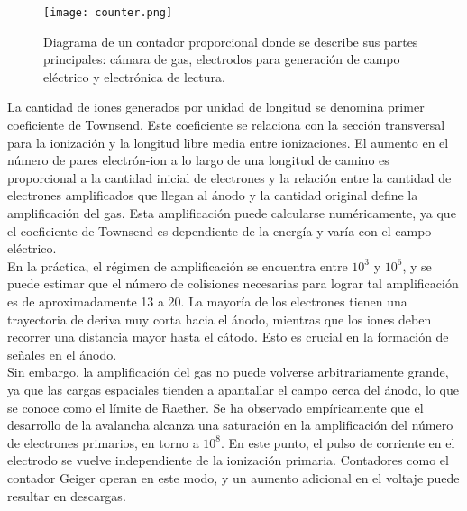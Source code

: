 \documentclass{article}
\begin{document}
\begin{figure}[H]
    \centering
    \texttt{[image: counter.png]}
    \caption{Diagrama de un contador proporcional donde se describe sus partes principales: cámara de gas, electrodos para generación de campo eléctrico y electrónica de lectura.}
    \label{fig:counter}
\end{figure}

\noindent La cantidad de iones generados por unidad de longitud se denomina primer coeficiente de Townsend. Este coeficiente se relaciona con la sección transversal para la ionización y la longitud libre media entre ionizaciones. El aumento en el número de pares electrón-ion a lo largo de una longitud de camino es proporcional a la cantidad inicial de electrones y la relación entre la cantidad de electrones amplificados que llegan al ánodo y la cantidad original define la amplificación del gas. Esta amplificación puede calcularse numéricamente, ya que el coeficiente de Townsend es dependiente de la energía y varía con el campo eléctrico.\\

\noindent En la práctica, el régimen de amplificación se encuentra entre \(10^3\) y \(10^6\), y se puede estimar que el número de colisiones necesarias para lograr tal amplificación es de aproximadamente 13 a 20. La mayoría de los electrones tienen una trayectoria de deriva muy corta hacia el ánodo, mientras que los iones deben recorrer una distancia mayor hasta el cátodo. Esto es crucial en la formación de señales en el ánodo.\\

\noindent Sin embargo, la amplificación del gas no puede volverse arbitrariamente grande, ya que las cargas espaciales tienden a apantallar el campo cerca del ánodo, lo que se conoce como el límite de Raether. Se ha observado empíricamente que el desarrollo de la avalancha alcanza una saturación en la amplificación del número de electrones primarios, en torno a \(10^8\). En este punto, el pulso de corriente en el electrodo se vuelve independiente de la ionización primaria. Contadores como el contador Geiger operan en este modo, y un aumento adicional en el voltaje puede resultar en descargas.\\
\end{document}

